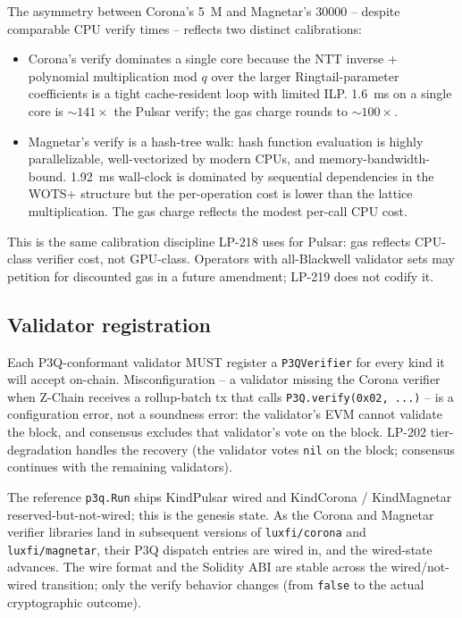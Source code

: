 The asymmetry between Corona's \SI{5}{M} and Magnetar's
\SI{30000}{} -- despite comparable CPU verify times -- reflects
two distinct calibrations:

\begin{itemize}[leftmargin=2em,nosep]
\item Corona's verify dominates a single core because the NTT
  inverse + polynomial multiplication mod $q$ over the larger
  Ringtail-parameter coefficients is a tight cache-resident loop with
  limited ILP. \SI{1.6}{\milli\second} on a single core is
  $\sim$$141\times$ the Pulsar verify; the gas charge rounds
  to $\sim$$100\times$.
\item Magnetar's verify is a hash-tree walk: hash function
  evaluation is highly parallelizable, well-vectorized by
  modern CPUs, and memory-bandwidth-bound. \SI{1.92}{\milli\second}
  wall-clock is dominated by sequential dependencies in the
  WOTS+ structure but the per-operation cost is lower than the
  lattice multiplication. The gas charge reflects the modest
  per-call CPU cost.
\end{itemize}

This is the same calibration discipline LP-218 uses for Pulsar:
gas reflects CPU-class verifier cost, not GPU-class. Operators
with all-Blackwell validator sets may petition for discounted
gas in a future amendment; LP-219 does not codify it.

\subsection{Validator registration}

Each P3Q-conformant validator MUST register a
\texttt{P3QVerifier} for every kind it will accept on-chain.
Misconfiguration -- a validator missing the Corona verifier
when Z-Chain receives a rollup-batch tx that calls
\texttt{P3Q.verify(0x02, ...)} -- is a configuration error, not
a soundness error: the validator's EVM cannot validate the
block, and consensus excludes that validator's vote on the
block. LP-202 tier-degradation handles the recovery (the
validator votes \texttt{nil} on the block; consensus continues
with the remaining validators).

The reference \texttt{p3q.Run} ships KindPulsar wired and
KindCorona / KindMagnetar reserved-but-not-wired; this is the
genesis state. As the Corona and Magnetar verifier libraries
land in subsequent versions of \texttt{luxfi/corona} and
\texttt{luxfi/magnetar}, their P3Q dispatch entries are wired
in, and the wired-state advances. The wire format and the
Solidity ABI are stable across the wired/not-wired transition;
only the verify behavior changes (from \texttt{false} to the
actual cryptographic outcome).

